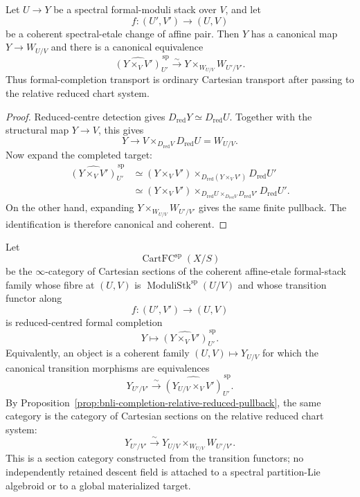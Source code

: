 \begin{proposition}
\label{prop:bnli-completion-relative-reduced-pullback}
Let $U\to Y$ be a spectral formal-moduli stack over $V$, and let
\[
    f:(U',V')\longrightarrow(U,V)
\]
be a coherent spectral-etale change of affine pair.  Then $Y$ has a canonical
map $Y\to W_{U/V}$ and there is a canonical equivalence
\[
\boxed{
    \widehat{(Y\times_VV')}^{\,\mathrm{sp}}_{U'}
    \xrightarrow{\sim}
    Y\times_{W_{U/V}}W_{U'/V'}.}
\]
Thus formal-completion transport is ordinary Cartesian transport after
passing to the relative reduced chart system.
\end{proposition}

\begin{proof}
Reduced-centre detection gives
$D_{\mathrm{red}}Y\simeq D_{\mathrm{red}}U$.  Together with the structural
map $Y\to V$, this gives
\[
    Y\longrightarrow
    V\times_{D_{\mathrm{red}}V}D_{\mathrm{red}}U
    =W_{U/V}.
\]
Now expand the completed target:
\[
\begin{aligned}
    \widehat{(Y\times_VV')}^{\,\mathrm{sp}}_{U'}
    &\simeq
    (Y\times_VV')
    \times_{D_{\mathrm{red}}(Y\times_VV')}
    D_{\mathrm{red}}U'\\
    &\simeq
    (Y\times_VV')
    \times_{D_{\mathrm{red}}U
      \times_{D_{\mathrm{red}}V}D_{\mathrm{red}}V'}
    D_{\mathrm{red}}U'.
\end{aligned}
\]
On the other hand, expanding
$Y\times_{W_{U/V}}W_{U'/V'}$ gives the same finite pullback.  The
identification is therefore canonical and coherent.
\end{proof}

\begin{definition}
\label{def:bnli-global-formal-moduli-stack-descent}
Let
\[
    \operatorname{CartFC}^{\mathrm{sp}}(X/S)
\]
be the $\infty$-category of Cartesian sections of the coherent affine-etale
formal-stack family whose fibre at $(U,V)$ is
$\operatorname{ModuliStk}^{\mathrm{sp}}(U/V)$ and whose transition functor
along
\[
    f:(U',V')\longrightarrow(U,V)
\]
is reduced-centred formal completion
\[
    Y\longmapsto
    \widehat{(Y\times_VV')}^{\,\mathrm{sp}}_{U'}.
\]
Equivalently, an object is a coherent family $(U,V)\mapsto Y_{U/V}$ for which
the canonical transition morphisms are equivalences
\[
    Y_{U'/V'}
    \xrightarrow{\sim}
    \widehat{(Y_{U/V}\times_VV')}^{\,\mathrm{sp}}_{U'}.
\]
By Proposition~\ref{prop:bnli-completion-relative-reduced-pullback}, the same
category is the category of Cartesian sections on the relative reduced chart
system:
\[
    Y_{U'/V'}
    \xrightarrow{\sim}
    Y_{U/V}\times_{W_{U/V}}W_{U'/V'}.
\]
This is a section category constructed from the transition functors; no
independently retained descent field is attached to a spectral partition-Lie
algebroid or to a global materialized target.
\end{definition}

